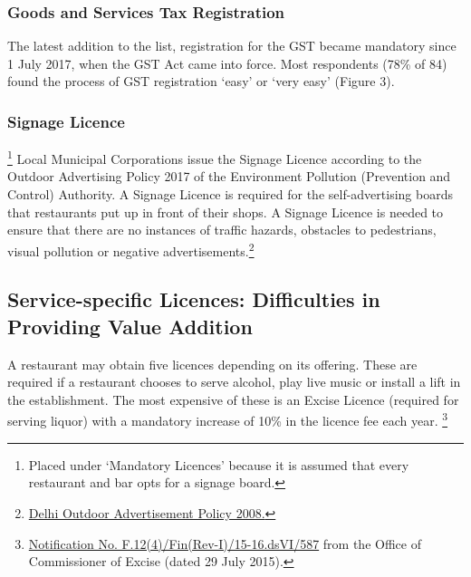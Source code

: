 \documentclass[a4paper, 12pt]{article}
\begin{document}

		\subsubsection{Goods and Services Tax Registration}
		The latest addition to the list, registration for the GST became mandatory since 1 July 2017, when the GST Act came into force. Most respondents (78\% of 84) found the process of GST registration ‘easy’ or ‘very easy’ (Figure 3).
		
		\subsubsection{Signage Licence}\footnote{Placed under ‘Mandatory Licences’ because it is assumed that every restaurant and bar opts for a signage board.}
		Local Municipal Corporations issue the Signage Licence according to the Outdoor Advertising Policy 2017 of the Environment Pollution (Prevention and Control) Authority. A Signage Licence is required for the self-advertising boards that restaurants put 
up in front of their shops. A Signage Licence is needed to ensure that there are no instances of traffic hazards, obstacles to pedestrians, visual pollution or negative advertisements.\footnote{\href{https://bit.ly/2xdiNzk}{Delhi Outdoor Advertisement Policy 2008.}}
		

		
		\subsection{Service-specific Licences: Difficulties in Providing Value Addition}
		
		
		A restaurant may obtain five licences depending on its offering. These are required if a restaurant chooses to serve alcohol, play live music or install a lift in the establishment. The most expensive of these is an Excise Licence (required for serving liquor) 
with a mandatory increase of 10\% in the licence fee each year. \footnote{\href{https://bit.ly/2xoejoG}{Notification No. F.12(4)/Fin(Rev-I)/15-16.dsVI/587} from the Office of Commissioner of Excise (dated 29 July 2015).}
		
		
\end{document}
